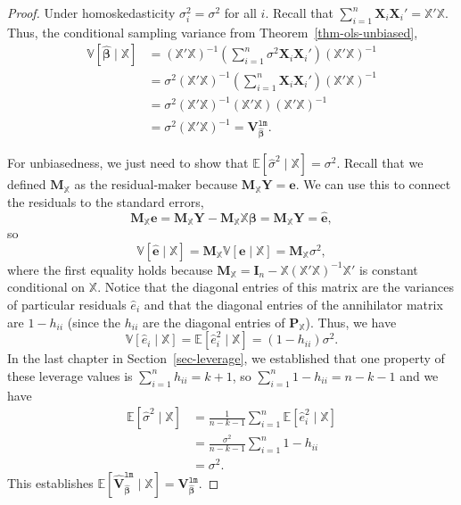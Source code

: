 \documentclass[
  13pt,
  letterpaper,
  DIV=11,
  numbers=noendperiod]{scrreprt}
\newcommand{\mb}{\bm}
\newcommand{\E}{\mathbb{E}}
\newcommand{\V}{\mathbb{V}}
\newcommand{\X}{\mb{X}}
\newcommand{\Xmat}{\mathbb{X}}
\newcommand{\bfbeta}{\mb{\beta}}
\newcommand{\bhat}{\widehat{\mb{\beta}}}
\theoremstyle{plain}
\theoremstyle{plain}
\theoremstyle{definition}
\theoremstyle{definition}
\theoremstyle{remark}
\begin{document}
\begin{proof}
Under homoskedasticity \(\sigma^2_i = \sigma^2\) for all \(i\). Recall
that \(\sum_{i=1}^n \X_i\X_i' = \Xmat'\Xmat\). Thus, the conditional
sampling variance from Theorem~\ref{thm-ols-unbiased}, \[ 
\begin{aligned}
\V[\bhat \mid \Xmat] &= \left( \Xmat'\Xmat \right)^{-1}\left( \sum_{i=1}^n \sigma^2 \X_i\X_i' \right) \left( \Xmat'\Xmat \right)^{-1} \\ &= \sigma^2\left( \Xmat'\Xmat \right)^{-1}\left( \sum_{i=1}^n \X_i\X_i' \right) \left( \Xmat'\Xmat \right)^{-1} \\&= \sigma^2\left( \Xmat'\Xmat \right)^{-1}\left( \Xmat'\Xmat \right) \left( \Xmat'\Xmat \right)^{-1} \\&= \sigma^2\left( \Xmat'\Xmat \right)^{-1} = \mb{V}^{\texttt{lm}}_{\bhat}.
\end{aligned}
\]

For unbiasedness, we just need to show that
\(\E[\widehat{\sigma}^{2} \mid \Xmat] = \sigma^2\). Recall that we
defined \(\mb{M}_{\Xmat}\) as the residual-maker because
\(\mb{M}_{\Xmat}\mb{Y} = \widehat{\mb{e}}\). We can use this to connect
the residuals to the standard errors, \[ 
\mb{M}_{\Xmat}\mb{e} = \mb{M}_{\Xmat}\mb{Y} - \mb{M}_{\Xmat}\Xmat\bfbeta = \mb{M}_{\Xmat}\mb{Y} = \widehat{\mb{e}},
\] so \[
\V[\widehat{\mb{e}} \mid \Xmat] = \mb{M}_{\Xmat}\V[\mb{e} \mid \Xmat] = \mb{M}_{\Xmat}\sigma^2,
\] where the first equality holds because
\(\mb{M}_{\Xmat} = \mb{I}_{n} - \Xmat (\Xmat'\Xmat)^{-1} \Xmat'\) is
constant conditional on \(\Xmat\). Notice that the diagonal entries of
this matrix are the variances of particular residuals \(\widehat{e}_i\)
and that the diagonal entries of the annihilator matrix are
\(1 - h_{ii}\) (since the \(h_{ii}\) are the diagonal entries of
\(\mb{P}_{\Xmat}\)). Thus, we have \[ 
\V[\widehat{e}_i \mid \Xmat] = \E[\widehat{e}_{i}^{2} \mid \Xmat] = (1 - h_{ii})\sigma^{2}.
\] In the last chapter in Section~\ref{sec-leverage}, we established
that one property of these leverage values is
\(\sum_{i=1}^n h_{ii} = k+ 1\), so
\(\sum_{i=1}^n 1- h_{ii} = n - k - 1\) and we have \[ 
\begin{aligned}
  \E[\widehat{\sigma}^{2} \mid \Xmat] &= \frac{1}{n-k-1} \sum_{i=1}^{n} \E[\widehat{e}_{i}^{2} \mid \Xmat] \\
                                      &= \frac{\sigma^{2}}{n-k-1} \sum_{i=1}^{n} 1 - h_{ii} \\
                                      &= \sigma^{2}. 
\end{aligned}
\] This establishes
\(\E[\widehat{\mb{V}}^{\texttt{lm}}_{\bhat} \mid \Xmat] = \mb{V}^{\texttt{lm}}_{\bhat}\).
\end{proof}
\end{document}
